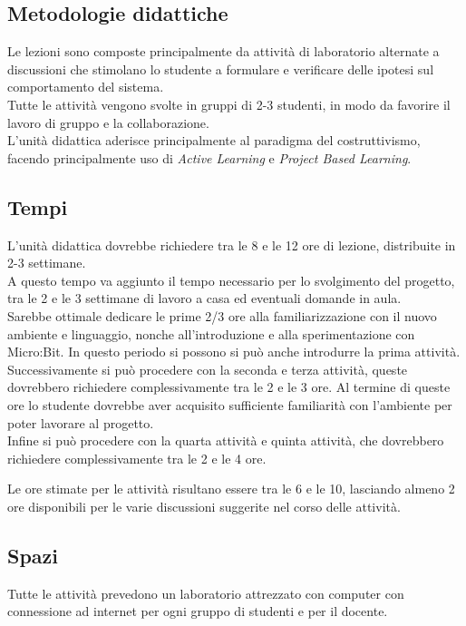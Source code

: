 \documentclass[../../relazione.tex]{subfiles}
\begin{document}
\subsection{Metodologie didattiche}

Le lezioni sono composte principalmente da attività di laboratorio alternate a discussioni che stimolano lo studente a formulare e verificare delle ipotesi sul comportamento del sistema.\\
Tutte le attività vengono svolte in gruppi di 2-3 studenti, in modo da favorire il lavoro di gruppo e la collaborazione.\\
L'unità didattica aderisce principalmente al paradigma del costruttivismo, facendo principalmente uso di \textit{Active Learning} e \textit{Project Based Learning}.

\subsection{Tempi}
L'unità didattica dovrebbe richiedere tra le 8 e le 12 ore di lezione, distribuite in 2-3 settimane.\\
A questo tempo va aggiunto il tempo necessario per lo svolgimento del progetto, tra le 2 e le 3 settimane di lavoro a casa ed eventuali domande in aula.\\
Sarebbe ottimale dedicare le prime 2/3 ore alla familiarizzazione con il nuovo ambiente e linguaggio, nonche all'introduzione e alla sperimentazione con Micro:Bit. In questo periodo si possono si può anche introdurre la prima attività.\\
Successivamente si può procedere con la seconda e terza attività, queste dovrebbero richiedere complessivamente tra le 2 e le 3 ore. Al termine di queste ore lo studente dovrebbe aver acquisito sufficiente familiarità con l'ambiente per poter lavorare al progetto.\\
Infine si può procedere con la quarta attività e quinta attività, che dovrebbero richiedere complessivamente tra le 2 e le 4 ore. 

Le ore stimate per le attività risultano essere tra le 6 e le 10, lasciando almeno 2 ore disponibili per le varie discussioni suggerite nel corso delle attività.

\subsection{Spazi}
Tutte le attività prevedono un laboratorio attrezzato con computer con connessione ad internet per ogni gruppo di studenti e per il docente. 
\end{document}
